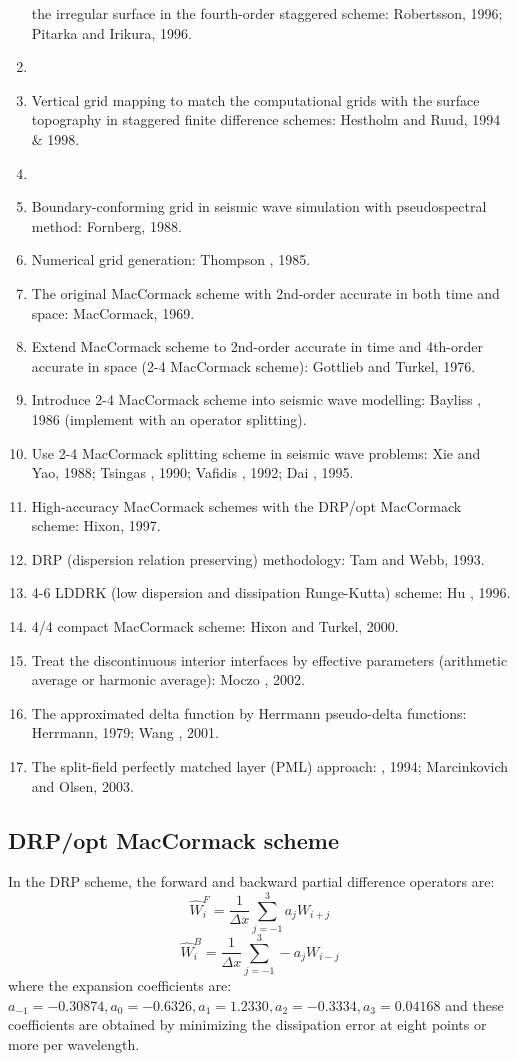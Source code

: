 \begin{enumerate}[\hspace{10mm}*]
    the irregular surface in the fourth-order staggered scheme:
    Robertsson, 1996; Pitarka and Irikura, 1996.
  \item \sline
  \item Vertical grid mapping to match the computational grids with
    the surface topography in staggered finite difference schemes:
    Hestholm and Ruud, 1994 \& 1998.
  \item \sline
  \item Boundary-conforming grid in seismic wave simulation with
    pseudospectral method: Fornberg, 1988.
  \item Numerical grid generation: Thompson \etal, 1985.
  \item The original MacCormack scheme with 2nd-order accurate
    in both time and space: MacCormack, 1969.
  \item Extend MacCormack scheme to 2nd-order accurate in time and
    4th-order accurate in space (2-4 MacCormack scheme):
    Gottlieb and Turkel, 1976.
  \item Introduce 2-4 MacCormack scheme into seismic wave modelling:
    Bayliss \etal, 1986 (implement with an operator splitting).
  \item Use 2-4 MacCormack splitting scheme in seismic wave problems:
    Xie and Yao, 1988; Tsingas \etal, 1990; Vafidis \etal, 1992;
    Dai \etal, 1995.
  \item High-accuracy MacCormack schemes with the DRP/opt MacCormack scheme:
    Hixon, 1997.
  \item DRP (dispersion relation preserving) methodology: Tam and Webb, 1993.
  \item 4-6 LDDRK (low dispersion and dissipation Runge-Kutta) scheme:
    Hu \etal, 1996.
  \item 4/4 compact MacCormack scheme: Hixon and Turkel, 2000.
  \item Treat the discontinuous interior interfaces by effective parameters
    (arithmetic average or harmonic average): Moczo \etal, 2002.
  \item The approximated delta function by Herrmann pseudo-delta functions:
    Herrmann, 1979; Wang \etal, 2001.
  \item The split-field perfectly matched layer (PML) approach:
    \Berenger, 1994; Marcinkovich and Olsen, 2003.
\end{enumerate}

\subsection{DRP/opt MacCormack scheme}
In the DRP scheme, the forward and backward partial difference operators are:
\[ \hat W_i^F=\frac{1}{\Delta x}\sum_{j=-1}^3a_jW_{i+j} \]
\[ \hat W_i^B=\frac{1}{\Delta x}\sum_{j=-1}^3-a_jW_{i-j} \]
where the expansion coefficients are:
$a_{-1}=-0.30874,a_0=-0.6326,a_1=1.2330,a_2=-0.3334,a_3=0.04168$
and these coefficients are obtained by minimizing the dissipation error
at eight points or more per wavelength.

